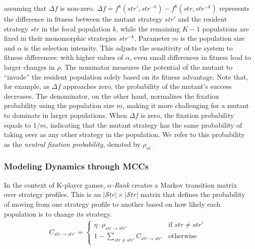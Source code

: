 \begin{flushleft}
\begin{flushleft}
        assuming that $\Delta f$ is non-zero. $\Delta f = f^k(str', str^{-k}) - f^k(str, str^{-k})$ represents the difference in fitness between the mutant strategy $str'$ and the resident strategy $str$ in the focal population $k$, while the remaining $K - 1$ populations are fixed in their monomorphic strategies $str^{-k}$. Parameter $m$ is the population size and $\alpha$ is the selection intensity. This adjusts the sensitivity of the system to fitness differences: with higher values of $\alpha$, even small differences in fitness lead to larger changes in $\rho$. The nominator measures the potential of the mutant to ``invade'' the resident population solely based on its fitness advantage. Note that, for example, as $\Delta f$ approaches zero, the probability of the mutant's success decreases. The denominator, on the other hand, normalizes the fixation probability using the population size $m$, making it more challenging for a mutant to dominate in larger populations. When $\Delta f$ is zero, the fixation probability equals to $1/m$, indicating that the mutant strategy has the same probability of taking over as any other strategy in the population. We refer to this probability as the \emph{neutral fixation probability}, denoted by $\rho_m$.

    \end{flushleft}

    \subsubsection{Modeling Dynamics through MCCs}
    
    \begin{flushleft}

        In the context of K-player games, \emph{$\alpha$-Rank} creates a Markov transition matrix over strategy profiles. This is an $|\mathcal{S}tr| \times |\mathcal{S}tr|$ matrix that defines the probability of moving from one strategy profile to another based on how likely each population is to change its strategy.
        \begin{eqnarray}
            C_{str \to str'} = 
            \begin{cases} 
                \eta \cdot \rho_{str \to str'} & \text{if } str \neq str' \\ 
                1 - \sum_{str \neq str'} C_{str \to str'} & \text{otherwise}
            \end{cases} 
            \label{eq:transition_matrix_entry}
        \end{eqnarray}


\end{flushleft}
\end{flushleft}
